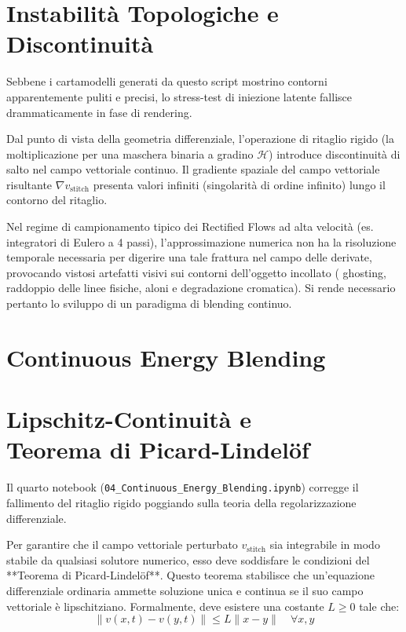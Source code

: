 \documentclass[12pt,a4paper]{report}
\begin{document}
\section{Instabilità Topologiche e Discontinuità}
Sebbene i cartamodelli generati da questo script mostrino contorni apparentemente puliti e precisi, lo stress-test di iniezione latente fallisce drammaticamente in fase di rendering. 

Dal punto di vista della geometria differenziale, l'operazione di ritaglio rigido (la moltiplicazione per una maschera binaria a gradino $\mathcal{H}$) introduce discontinuità di salto nel campo vettoriale continuo. Il gradiente spaziale del campo vettoriale risultante $\nabla v_{\text{stitch}}$ presenta valori infiniti (singolarità di ordine infinito) lungo il contorno del ritaglio. 

Nel regime di campionamento tipico dei Rectified Flows ad alta velocità (es. integratori di Eulero a 4 passi), l'approssimazione numerica non ha la risoluzione temporale necessaria per digerire una tale frattura nel campo delle derivate, provocando vistosi artefatti visivi sui contorni dell'oggetto incollato ( ghosting, raddoppio delle linee fisiche, aloni e degradazione cromatica). Si rende necessario pertanto lo sviluppo di un paradigma di blending continuo.

\section{Continuous Energy Blending}
\section{\texorpdfstring{Lipschitz-Continuità e\\ Teorema di Picard-Lindelöf}{Lipschitz-Continuità e Teorema di Picard-Lindelöf}}
Il quarto notebook (\texttt{04\_Continuous\_Energy\_Blending.ipynb}) corregge il fallimento del ritaglio rigido poggiando sulla teoria della regolarizzazione differenziale. 

Per garantire che il campo vettoriale perturbato $v_{\text{stitch}}$ sia integrabile in modo stabile da qualsiasi solutore numerico, esso deve soddisfare le condizioni del **Teorema di Picard-Lindelöf**. Questo teorema stabilisce che un'equazione differenziale ordinaria ammette soluzione unica e continua se il suo campo vettoriale è lipschitziano. Formalmente, deve esistere una costante $L \ge 0$ tale che:
\begin{equation}
    \|v(x, t) - v(y, t)\| \le L \|x - y\| \quad \forall x, y
\end{equation}
\end{document}
